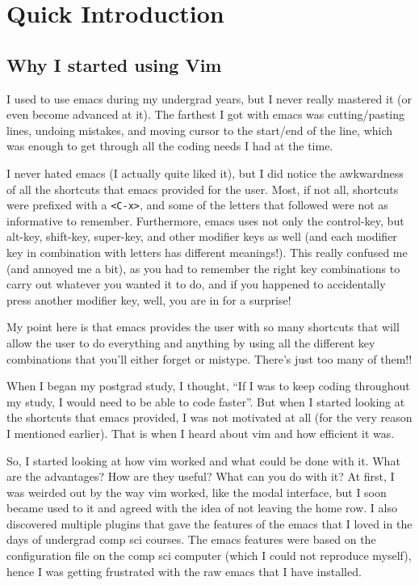 \chapter{Quick Introduction}

\section{Why I started using Vim}

I used to use emacs during my undergrad years, but I never really mastered  it (or even become advanced at it).
The farthest I got with emacs was cutting/pasting lines, undoing mistakes, and moving cursor to the start/end of the line, which was enough to get through all the coding needs I had at the time.

I never hated emacs (I actually quite liked it), but I did notice the awkwardness of all the shortcuts that emacs provided for the user.
Most, if not all, shortcuts were prefixed with a \verb|<C-x>|, and some of the letters that followed were not as informative to remember.
Furthermore, emacs uses not only the control-key, but alt-key, shift-key, super-key, and other modifier keys as well (and each modifier key in combination with letters has different meanings!).
This really confused me (and annoyed me a bit), as you had to remember the right key combinations to carry out whatever you wanted it to do, and if you happened to accidentally press another modifier key, well, you are in for a surprise!

My point here is that emacs provides the user with so many shortcuts that will allow the user to do everything and anything by using all the different key combinations that you'll either forget or mistype.
There's just too many of them!!

When I began my postgrad study, I thought, ``If I was to keep coding throughout my study, I would need to be able to code faster''.
But when I started looking at the shortcuts that emacs provided, I was not motivated at all (for the very reason I mentioned earlier).
That is when I heard about vim and how efficient it was.

So, I started looking at how vim worked and what could be done with it.
What are the advantages?
How are they useful?
What can you do with it?
At first, I was weirded out by the way vim worked, like the modal interface, but I soon became used to it and agreed with the idea of not leaving the home row.
I also discovered multiple plugins that gave the features of the emacs that I loved in the days of undergrad comp sci courses.
The emacs features were based on the configuration file on the comp sci computer (which I could not reproduce myself), hence I was getting frustrated with the raw emacs that I have installed.

